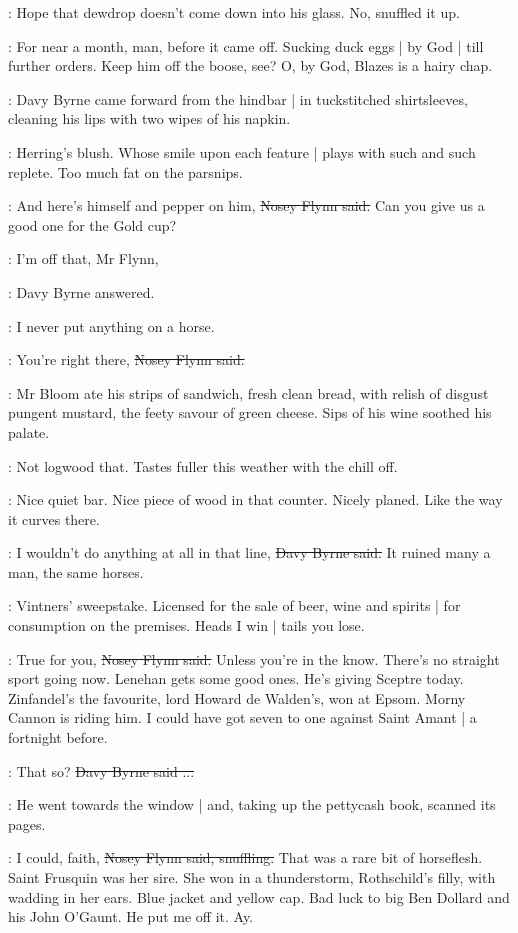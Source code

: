 \BloomInt:
Hope that dewdrop doesn't come down into his glass.
No,
snuffled it up.

\nosey:
For near a month, man,
before it came off.
Sucking duck eggs |
by God |
till further orders.
Keep him off the boose, see?
O, by God,
Blazes is a hairy chap.

:
Davy Byrne came forward from the hindbar |
in tuckstitched shirtsleeves,
cleaning his lips with two wipes of his napkin.

\BloomInt:
Herring's blush.
Whose smile upon each feature |
plays with such and such replete.
Too much fat on the parsnips.

\nosey:
And here's himself and pepper on him,
\sout{Nosey Flynn said.}
Can you give us a good one for the Gold cup?

\davybyrne:
I'm off that, Mr Flynn,

:
Davy Byrne answered.

\davybyrne:
I never put anything on a horse.

\nosey:
You're right there,
\sout{Nosey Flynn said.}

:
Mr Bloom ate his strips of sandwich,
fresh clean bread,
with relish of disgust pungent mustard,
the feety savour of green cheese.
Sips of his wine soothed his palate.

\BloomInt:
Not logwood that.
Tastes fuller this weather with the chill off.

\BloomInt:
Nice quiet bar.
Nice piece of wood in that counter.
Nicely planed.
Like the way it curves there.

\davybyrne:
I wouldn't do anything at all in that line,
\sout{Davy Byrne said.}
It ruined many a man,
the same horses.

\BloomInt:
Vintners' sweepstake.
Licensed for the sale of beer, wine and spirits |
for consumption on the premises.
Heads I win |
tails you lose.

\nosey:
True for you,
\sout{Nosey Flynn said.}
Unless you're in the know.
There's no straight sport going now.
Lenehan gets some good ones.
He's giving Sceptre today.
Zinfandel's the favourite,
lord Howard de Walden's,
won at Epsom.
Morny Cannon is riding him.
I could have got seven to one against Saint Amant |
a fortnight before.

\davybyrne:
That so?
\sout{Davy Byrne said ...}

:
He went towards the window |
and, taking up the pettycash book,
scanned its pages.

\nosey:
I could, faith,
\sout{Nosey Flynn said, snuffling.}
That was a rare bit of horseflesh.
Saint Frusquin was her sire.
She won in a thunderstorm,
Rothschild's filly,
with wadding in her ears.
Blue jacket and yellow cap.
Bad luck to big Ben Dollard and his John O'Gaunt.
He put me off it.
Ay.

